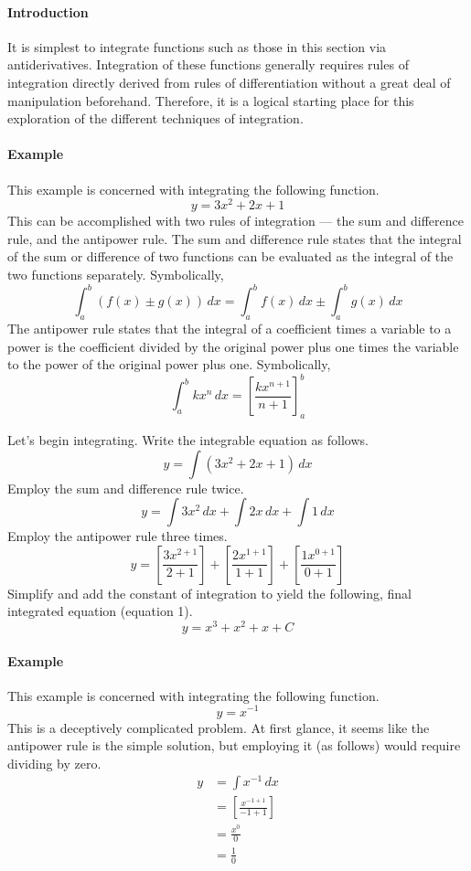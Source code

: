 \documentclass{article}
\newcounter{example}%
\newcommand{\ex}{\stepcounter{example} \paragraph{Example \theexample}}
\begin{document}
\paragraph{Introduction} It is simplest to integrate functions such as those in this section via antiderivatives. Integration of these functions generally requires rules of integration directly derived from rules of differentiation without a great deal of manipulation beforehand. Therefore, it is a logical starting place for this exploration of the different techniques of integration.
\ex This example is concerned with integrating the following function.$$y=3x^2+2x+1$$This can be accomplished with two rules of integration --- the sum and difference rule, and the antipower rule. The sum and difference rule states that the integral of the sum or difference of two functions can be evaluated as the integral of the two functions separately. Symbolically,$$\int_a^b (f(x)\pm g(x))\, dx=\int_a^b f(x)\, dx\pm\int_a^b g(x)\, dx$$The antipower rule states that the integral of a coefficient times a variable to a power is the coefficient divided by the original power plus one times the variable to the power of the original power plus one. Symbolically,$$\int_a^b kx^n\, dx=\left[\frac{kx^{n+1}}{n+1}\right]_a^b$$\par
Let's begin integrating. Write the integrable equation as follows.
\begin{equation*}
    y=\int (3x^2+2x+1)\, dx
\end{equation*}
Employ the sum and difference rule twice.
\begin{equation*}
    y=\int 3x^2\, dx+\int 2x\, dx+\int 1\, dx
\end{equation*}
Employ the antipower rule three times.
\begin{equation*}
    y=\left[\frac{3x^{2+1}}{2+1}\right]+\left[\frac{2x^{1+1}}{1+1}\right]+\left[\frac{1x^{0+1}}{0+1}\right]
\end{equation*}
Simplify and add the constant of integration to yield the following, final integrated equation (equation 1).
\begin{equation}
    y=x^3+x^2+x+C
\end{equation}
\ex This example is concerned with integrating the following function.$$y=x^{-1}$$This is a deceptively complicated problem. At first glance, it seems like the antipower rule is the simple solution, but employing it (as follows) would require dividing by zero.
\begin{align*}
    y &= \int x^{-1}\, dx\\
      &= \left[\frac{x^{-1+1}}{-1+1}\right]\\
      &= \frac{x^0}{0}\\
      &= \frac{1}{0}
\end{align*}
\end{document}
